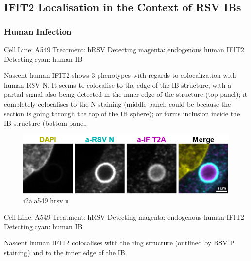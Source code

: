 \subsection{IFIT2 Localisation in the Context of RSV IBs} \label{subsec:IFIT2 Localisation in the Context of RSV IBs}
\subsubsection{Human Infection}
Cell Line: A549 \newline
Treatment: hRSV \newline
Detecting magenta: endogenous human IFIT2  \newline
Detecting cyan: human IB \newline

Nascent human IFIT2 shows 3 phenotypes with regards to colocalization with human RSV N. It seems to colocalise to the edge of the IB structure, with a partial signal also being detected in the inner edge of the structure (top panel); it completely colocalises to the N staining (middle panel; could be because the section is going through the top of the IB sphere); or forms inclusion inside the IB structure (bottom panel. 

\begin{figure}
    \centering
    \includegraphics[width=1\linewidth]{10. Chapter 5/Figs/01. Infection/01. i2a a549 hrsv n.png}
    \caption[i2a a549 hrsv n]{i2a a549 hrsv n}
    \label{fig:i2a a549 hrsv n}
\end{figure}

Cell Line: A549 \newline
Treatment: hRSV \newline
Detecting magenta: endogenous human IFIT2  \newline
Detecting cyan: human IB \newline

Nascent human IFIT2 colocalises with the ring structure (outlined by RSV P staining) and to the inner edge of the IB.

